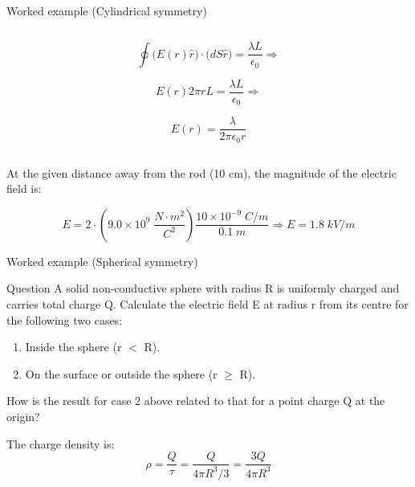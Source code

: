 {\begin{frame}{Worked example (Cylindrical symmetry)}
\begin{columns}
\begin{column}{0.55\textwidth}
    \begin{equation*}
      \oint \Big( E(r) \hat{r} \Big) \cdot \Big( dS \hat{r} \Big) = \frac{\lambda L}{\epsilon_0} \Rightarrow
    \end{equation*}

    \begin{equation*}
      E(r) 2\pi r L = \frac{\lambda L}{\epsilon_0} \Rightarrow
    \end{equation*}

    \begin{equation*}
      E(r) = \frac{\lambda}{2 \pi \epsilon_0 r}
    \end{equation*}

  \end{column}
\end{columns}

\vspace{0.3cm}

At the given distance away from the rod (10 cm), the magnitude of the electric field is:

\begin{equation*}
 E = 2 \cdot (9.0 \times 10^9 \; \frac{N \cdot m^2}{C^2}) \frac{10 \times 10^{-9} \; C/m}{0.1 \; m} \Rightarrow
 E = 1.8 \; kV/m
\end{equation*}

\end{frame}


%
%

\begin{frame}{Worked example (Spherical symmetry)}

  \begin{blockexmplque}{Question}
    A solid non-conductive sphere with radius R is uniformly charged and carries total charge Q.
    Calculate the electric field E at radius r from its centre for the following two cases:
    \begin{enumerate}
       \item Inside the sphere (r $<$ R).
       \item On the surface or outside the sphere (r $\geq$ R).
    \end{enumerate}
    How is the result for case 2 above related to that for a point charge Q at
    the origin? \\
  \end{blockexmplque}
  \vspace{0.4cm}

  The charge density is:
  \begin{equation*}
    \rho = \frac{Q}{\tau} = \frac{Q}{4\pi R^3 /3} = \frac{3Q}{4\pi R^3}
  \end{equation*}


\end{frame}}
